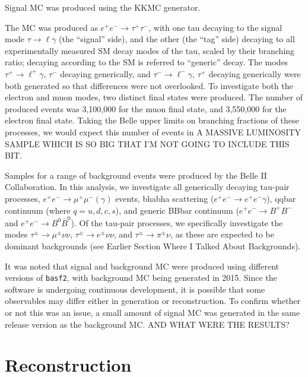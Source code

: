 \documentclass[12pt,a4paper]{article} %
\begin{document}
 Signal MC was produced using the KKMC generator. 

The MC was produced as $e^+ e^- \to \tau^+ \tau^-$, with one tau decaying to the signal mode $\tau \to \ell \gamma$ (the ``signal'' side), and the other (the ``tag'' side) decaying to all experimentally measured SM decay modes of the tau, scaled by their branching ratio; decaying according to the SM is referred to ``generic'' decay. The modes $\tau^+ \to \ell^+ \gamma$, $\tau^-$ decaying generically, and $\tau^- \to \ell^- \gamma$, $\tau^+$ decaying generically were both generated so that differences were not overlooked. To investigate both the electron and muon modes, two distinct final states were produced. The number of produced events was 3,100,000 for the muon final state, and 3,550,000 for the electron final state. Taking the Belle upper limits on branching fractions of these processes, we would expect this number of events in A MASSIVE LUMINOSITY SAMPLE WHICH IS SO BIG THAT I'M NOT GOING TO INCLUDE THIS BIT.

Samples for a range of background events were produced by the Belle II Collaboration. In this analysis, we investigate all generically decaying tau-pair processes, $e^+ e^- \to \mu^+ \mu^- (\gamma)$ events, bhabha scattering ($e^+ e^- \to e^+ e^- \gamma$), qqbar continuum (where $q = u, d, c, s$), and generic BBbar continuum ($e^+ e^- \to B^+ B^-$ and $e^+ e^- \to B^0 \bar{B}^0$). Of the tau-pair processes, we specifically investigate the modes $\tau^{\pm} \to \mu^{\pm} \nu \nu$, $\tau^{\pm} \to e^{\pm} \nu \nu$, and $\tau^{\pm} \to \pi^{\pm} \nu$, as these are expected to be dominant backgrounds (see Earlier Section Where I Talked About Backgrounds).

It was noted that signal and background MC were produced using different versions of \texttt{basf2}, with background MC being generated in 2015. Since the software is undergoing continuous development, it is possible that some observables may differ either in generation or reconstruction. To confirm whether or not this was an issue, a small amount of signal MC was generated in the same release version as the background MC. AND WHAT WERE THE RESULTS?


\pagebreak





\pagebreak

\section{Reconstruction}
\end{document}
